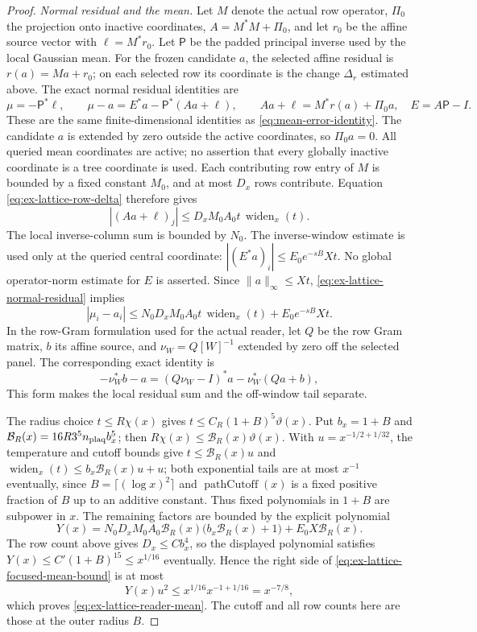 \begin{proof}
\emph{Normal residual and the mean.}
Let $M$ denote the actual row operator, $\Pi_0$ the projection onto
inactive coordinates, $A=M^*M+\Pi_0$, and let $r_0$ be the affine
source vector with $\ell=M^*r_0$.  Let $\mathsf P$ be the padded
principal inverse used by the local Gaussian mean. For the frozen
candidate $a$, the selected affine residual is $r(a)=Ma+r_0$; on each
selected row its coordinate is the change $\Delta_r$ estimated above.
The exact normal
residual identities are
\begin{equation}\label{eq:ex-lattice-normal-residual}
 \mu=-\mathsf P^*\ell,\qquad
 \mu-a=E^*a-\mathsf P^*(Aa+\ell),\qquad
 Aa+\ell=M^*r(a)+\Pi_0a,
 \quad E=A\mathsf P-I.
\end{equation}
These are the same finite-dimensional identities as
\eqref{eq:mean-error-identity}. The candidate $a$ is extended by zero
outside the active coordinates, so $\Pi_0a=0$. All queried mean
coordinates are active; no assertion that every globally inactive
coordinate is a tree coordinate is used.
Each contributing row entry of $M$ is bounded by a fixed constant
$M_0$, and at most $D_x$ rows contribute.  Equation
\eqref{eq:ex-lattice-row-delta} therefore gives
\[
 |(Aa+\ell)_j|\le D_xM_0A_0t\,\operatorname{widen}_x(t).
\]
The local inverse-column sum is bounded by $N_0$. The inverse-window
estimate is used only at the queried central coordinate:
$|(E^*a)_i|\le E_0e^{-sB}Xt$. No global operator-norm estimate for
$E$ is asserted. Since $\|a\|_\infty\le Xt$,
\eqref{eq:ex-lattice-normal-residual} implies
\begin{equation}\label{eq:ex-lattice-focused-mean-bound}
 |\mu_i-a_i|
 \le N_0D_xM_0A_0t\,\operatorname{widen}_x(t)+E_0e^{-sB}Xt.
\end{equation}
In the row-Gram formulation used for the actual reader, let $Q$ be
the row Gram matrix, $b$ its affine source, and $\nu_W=Q[W]^{-1}$
extended by zero off the selected panel.  The corresponding exact
identity is
\[
 -\nu_W^*b-a=(Q\nu_W-I)^*a-\nu_W^*(Qa+b),
\]
This form makes the local residual sum and the off-window tail
separate.

The radius choice $t\le R\chi(x)$ gives
$t\le C_R(1+B)^5\vartheta(x)$. Put
$b_x=1+B$ and $\mathcal B_R(x)=16R3^5n_{\rm plaq}b_x^5$; then
$R\chi(x)\le\mathcal B_R(x)\vartheta(x)$. With
$u=x^{-1/2+1/32}$, the temperature and cutoff bounds give
$t\le\mathcal B_R(x)u$ and
$\operatorname{widen}_x(t)\le b_x\mathcal B_R(x)u+u$; both exponential
tails are at most $x^{-1}$ eventually, since $B=\lceil(\log x)^2\rceil$ and
$\operatorname{pathCutoff}(x)$ is a fixed positive fraction of $B$ up to an
additive constant. Thus fixed
polynomials in $1+B$ are subpower in $x$.  The
remaining factors are bounded by the explicit polynomial
\[
 Y(x)=N_0D_xM_0A_0\mathcal B_R(x)
       \bigl(b_x\mathcal B_R(x)+1\bigr)
       +E_0X\mathcal B_R(x).
\]
The row count above gives $D_x\le Cb_x^4$, so the displayed
polynomial satisfies $Y(x)\le C'(1+B)^{15}\le x^{1/16}$ eventually.
Hence the right side of
\eqref{eq:ex-lattice-focused-mean-bound} is at most
\[
 Y(x)u^2\le x^{1/16}x^{-1+1/16}=x^{-7/8},
\]
which proves \eqref{eq:ex-lattice-reader-mean}. The cutoff and all
row counts here are those at the outer radius $B$.


\end{proof}
